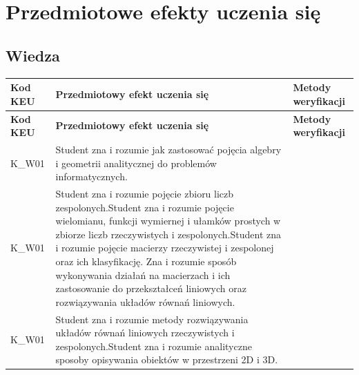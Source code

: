 \documentclass[12pt, a4paper]{article}
\newcommand{\thdrule}{\noalign{\global\setlength{\extrarowheight}{0pt}}}
\newcommand{\thdend}{\noalign{\global\setlength{\extrarowheight}{3pt}}}
\begin{document}
\section{Przedmiotowe efekty uczenia się}

\subsection*{Wiedza}
{\scriptsize
\begin{longtable}{m{1.6cm}m{9.0cm}m{4.2cm}}
\thdrule\toprule
\rowcolor{pjatkRed} {\color{white}\footnotesize\textbf{\vphantom{Ag}Kod KEU}} & {\color{white}\footnotesize\textbf{\vphantom{Ag}Przedmiotowy efekt uczenia się}} & {\color{white}\footnotesize\textbf{\vphantom{Ag}Metody weryfikacji}} \\
\midrule\thdend
\endfirsthead
\thdrule\toprule
\rowcolor{pjatkRed} {\color{white}\footnotesize\textbf{\vphantom{Ag}Kod KEU}} & {\color{white}\footnotesize\textbf{\vphantom{Ag}Przedmiotowy efekt uczenia się}} & {\color{white}\footnotesize\textbf{\vphantom{Ag}Metody weryfikacji}} \\
\midrule\thdend
\endhead
  \rowcolor{tableRowLight} K\_W01 & Student zna i rozumie  jak zastosować pojęcia algebry i geometrii analitycznej  do problemów informatycznych. &  \\
  \rowcolor{tableRowAlt} K\_W01 & Student zna i rozumie pojęcie zbioru liczb zespolonych.Student zna i rozumie pojęcie wielomianu, funkcji wymiernej i ułamków prostych w zbiorze liczb rzeczywistych i zespolonych.Student zna i rozumie pojęcie macierzy rzeczywistej i zespolonej  oraz ich klasyfikację. Zna i rozumie sposób wykonywania działań na macierzach  i ich zastosowanie do przekształceń liniowych oraz rozwiązywania układów równań liniowych. &  \\
  \rowcolor{tableRowLight} K\_W01 & Student zna i rozumie metody rozwiązywania układów równań liniowych rzeczywistych i zespolonych.Student zna i rozumie analityczne sposoby opisywania obiektów w przestrzeni 2D i 3D. &  \\
\bottomrule
\end{longtable}}
\end{document}
